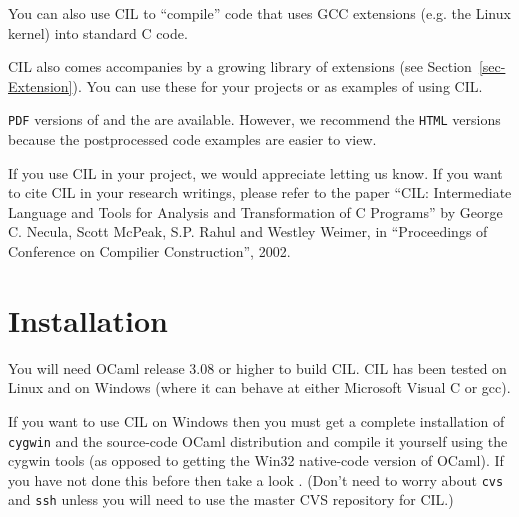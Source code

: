 \documentclass{article}
\def\secref#1{Section~\ref{sec-#1}}
\def\t#1{{\tt #1}}
\begin{document}
 You can also use CIL to ``compile'' code that uses GCC extensions (e.g. the
Linux kernel) into standard C code.

 CIL also comes accompanies by a growing library of extensions (see
\secref{Extension}). You can use these for your projects or as examples of
using CIL. 

\t{PDF} versions of  and the
 are available. However, we recommend the
\t{HTML} versions because the postprocessed code examples are easier to
view. 

 If you use CIL in your project, we would appreciate letting us know. If you
want to cite CIL in your research writings, please refer to the paper ``CIL:
Intermediate Language and Tools for Analysis and Transformation of C
Programs'' by George C. Necula, Scott McPeak, S.P. Rahul and Westley Weimer,
in ``Proceedings of Conference on Compilier Construction'', 2002.

\section{Installation}

You will need OCaml release 3.08 or higher to build CIL. CIL has been tested
on Linux and on Windows (where it can behave at either Microsoft Visual C or
gcc).

 If you want to use CIL on Windows then you must get a complete installation
of \t{cygwin} and the source-code OCaml distribution and compile it yourself
using the cygwin tools (as opposed to getting the Win32 native-code version of
OCaml). If you have not done this before then take a look
. (Don't need to worry about \t{cvs} and
\t{ssh} unless you will need to use the master CVS repository for CIL.)
\end{document}
